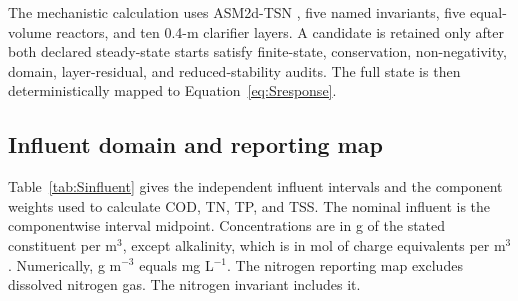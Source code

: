 \documentclass[a4paper,fleqn]{cas-sc}
\begin{document}
The mechanistic calculation uses ASM2d-TSN \citep{Henze2006}, five named invariants, five equal-volume reactors, and ten 0.4-m clarifier layers. A candidate is retained only after both declared steady-state starts satisfy finite-state, conservation, non-negativity, domain, layer-residual, and reduced-stability audits. The full state is then deterministically mapped to Equation~\eqref{eq:Sresponse}.

\subsection{Influent domain and reporting map}
\label{sec:Sinfluent}

Table~\ref{tab:Sinfluent} gives the independent influent intervals and the component weights used to calculate COD, TN, TP, and TSS. The nominal influent is the componentwise interval midpoint. Concentrations are in g of the stated constituent per m$^3$, except alkalinity, which is in mol of charge equivalents per m$^3$. Numerically, g m$^{-3}$ equals mg L$^{-1}$. The nitrogen reporting map excludes dissolved nitrogen gas. The nitrogen invariant includes it.
\end{document}
